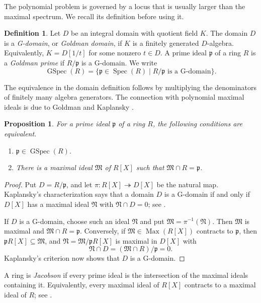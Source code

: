 \documentclass[11pt]{amsart}
\numberwithin{equation}{section}
\newtheorem{proposition}[theorem]{Proposition}
\theoremstyle{definition}
\newtheorem{definition}[theorem]{Definition}
\theoremstyle{remark}
\newcommand{\Spec}{\operatorname{Spec}}
\newcommand{\Max}{\operatorname{Max}}
\newcommand{\GSpec}{\operatorname{GSpec}}
\begin{document}
The polynomial problem is governed by a locus that is usually larger than the maximal spectrum.  We recall its definition before using it.

\begin{definition}\label{def:Goldman}
Let $D$ be an integral domain with quotient field $K$.  The domain $D$ is a \emph{G-domain}, or \emph{Goldman domain}, if $K$ is a finitely generated $D$-algebra.  Equivalently, $K=D[1/t]$ for some nonzero $t\in D$.  A prime ideal $\mathfrak p$ of a ring $R$ is a \emph{Goldman prime} if $R/\mathfrak p$ is a G-domain.  We write
\[
 \GSpec(R)=\{\mathfrak p\in\Spec(R)\mid R/\mathfrak p\text{ is a G-domain}\}.
\]
\end{definition}

The equivalence in the domain definition follows by multiplying the denominators of finitely many algebra generators.  The connection with polynomial maximal ideals is due to Goldman and Kaplansky \cite{Goldman,Kaplansky}.

\begin{proposition}\label{prop:Goldman-contraction}
For a prime ideal $\mathfrak p$ of a ring $R$, the following conditions are equivalent.
\begin{enumerate}[label=\textup{(\roman*)}]
\item $\mathfrak p\in\GSpec(R)$.
\item There is a maximal ideal $\mathfrak M$ of $R[X]$ such that $\mathfrak M\cap R=\mathfrak p$.
\end{enumerate}
\end{proposition}

\begin{proof}
Put $D=R/\mathfrak p$, and let $\pi:R[X]\twoheadrightarrow D[X]$ be the natural map.  Kaplansky's characterization says that a domain $D$ is a G-domain if and only if $D[X]$ has a maximal ideal $\mathfrak N$ with $\mathfrak N\cap D=0$; see \cite[Theorem~24]{Kaplansky}.

If $D$ is a G-domain, choose such an ideal $\mathfrak N$ and put $\mathfrak M=\pi^{-1}(\mathfrak N)$.  Then $\mathfrak M$ is maximal and $\mathfrak M\cap R=\mathfrak p$.  Conversely, if $\mathfrak M\in\Max(R[X])$ contracts to $\mathfrak p$, then $\mathfrak pR[X]\subseteq\mathfrak M$, and $\mathfrak N=\mathfrak M/\mathfrak pR[X]$ is maximal in $D[X]$ with
\[
 \mathfrak N\cap D=(\mathfrak M\cap R)/\mathfrak p=0.
\]
Kaplansky's criterion now shows that $D$ is a G-domain.
\end{proof}

A ring is \emph{Jacobson} if every prime ideal is the intersection of the maximal ideals containing it.  Equivalently, every maximal ideal of $R[X]$ contracts to a maximal ideal of $R$; see \cite{Goldman,Kaplansky}.
\end{document}
